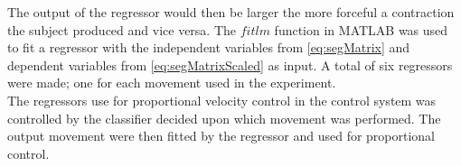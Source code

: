 The output of the regressor would then be larger the more forceful a contraction the subject produced and vice versa. The $fitlm$ function in MATLAB was used to fit a regressor with the independent variables from \eqref{eq:segMatrix} and dependent variables from \eqref{eq:segMatrixScaled} as input. A total of six regressors were made; one for each movement used in the experiment. \\
The regressors use for proportional velocity control in the control system was controlled by the classifier decided upon which movement was performed. The output movement were then fitted by the regressor and used for proportional control. 


